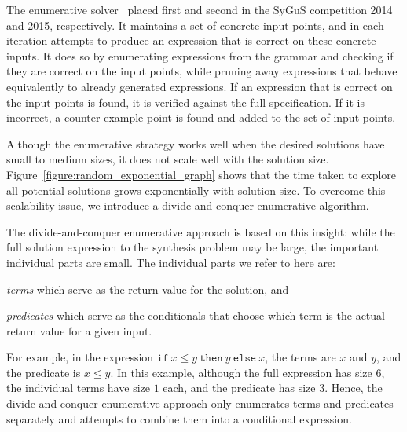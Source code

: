 \documentclass{llncs}
\newcommand\arsays[1]{{\color{red} \bf AR: #1}}
\newcommand\ITE[3]{\mathtt{if}~#1~\mathtt{then}~#2~\mathtt{else}~#3}
\newcommand{\sygus}{{\sffamily\fontsize{8.5}{10}\selectfont
    SyGuS}\xspace}
\begin{document}
The enumerative solver~\cite{udupa-sygus}
placed first and second in the \sygus competition 2014 and 2015,
respectively.
It maintains a set of concrete input points, and
in each iteration attempts to produce an expression that is correct on
these concrete inputs.
It does so by enumerating expressions from the grammar and checking if
they are correct on the input points, while pruning away expressions
that behave equivalently to already generated expressions.
If an expression that is correct on the input points is found, it is
verified against the full specification.
If it is incorrect, a counter-example point is found and added to the
set of input points.

Although the enumerative strategy works well when the desired solutions
have small to medium sizes, it does not scale well with the solution
size.  Figure~\ref{figure:random_exponential_graph}
shows that the time taken to explore all potential solutions
grows exponentially with solution size.  To overcome this scalability issue, we
introduce a divide-and-conquer enumerative algorithm.

The divide-and-conquer enumerative approach is based on this insight:
while the full solution expression to the synthesis problem may be
large, the important individual parts are small.
The individual parts we refer to here are:
\begin{inparaenum}[(a)]
\item {\em terms} which serve as the return value for the solution,
  and
\item {\em predicates} which serve as the conditionals that choose which
  term is the actual return value for a given input.
\end{inparaenum}
For example, in the expression $\ITE{x \leq y}{y}{x}$, the terms are $x$
and $y$, and the predicate is $x \leq y$.
In this example, although the full expression has size $6$,
the individual terms have size $1$ each, and the predicate has size $3$.
Hence, the divide-and-conquer enumerative approach only enumerates terms
and predicates separately and attempts to combine them into a
conditional expression.
\end{document}
